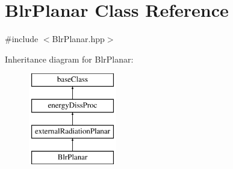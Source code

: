 \hypertarget{classBlrPlanar}{\section{Blr\-Planar Class Reference}
\label{classBlrPlanar}
}


{\ttfamily \#include $<$Blr\-Planar.\-hpp$>$}

Inheritance diagram for Blr\-Planar\-:\begin{figure}[H]
\begin{center}
\leavevmode
\includegraphics[height=4.000000cm]{classBlrPlanar}
\end{center}
\end{figure}



